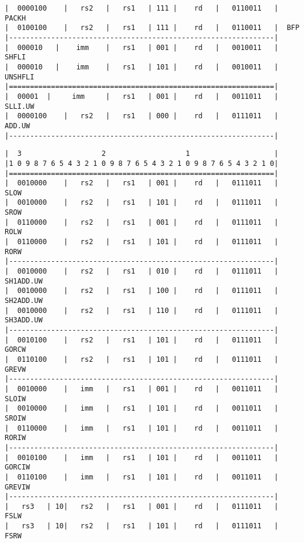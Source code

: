 \begin{minipage}{\linewidth}
\begin{verbatim}
|  0000100    |   rs2   |   rs1   | 111 |    rd   |   0110011   |  PACKH
|  0100100    |   rs2   |   rs1   | 111 |    rd   |   0110011   |  BFP
|---------------------------------------------------------------|
|  000010   |    imm    |   rs1   | 001 |    rd   |   0010011   |  SHFLI
|  000010   |    imm    |   rs1   | 101 |    rd   |   0010011   |  UNSHFLI
|===============================================================|
|  00001  |     imm     |   rs1   | 001 |    rd   |   0011011   |  SLLI.UW
|  0000100    |   rs2   |   rs1   | 000 |    rd   |   0111011   |  ADD.UW
|---------------------------------------------------------------|
\end{verbatim}
\end{minipage}

\begin{minipage}{\linewidth}
\begin{verbatim}
|  3                   2                   1                    |
|1 0 9 8 7 6 5 4 3 2 1 0 9 8 7 6 5 4 3 2 1 0 9 8 7 6 5 4 3 2 1 0|
|===============================================================|
|  0010000    |   rs2   |   rs1   | 001 |    rd   |   0111011   |  SLOW
|  0010000    |   rs2   |   rs1   | 101 |    rd   |   0111011   |  SROW
|  0110000    |   rs2   |   rs1   | 001 |    rd   |   0111011   |  ROLW
|  0110000    |   rs2   |   rs1   | 101 |    rd   |   0111011   |  RORW
|---------------------------------------------------------------|
|  0010000    |   rs2   |   rs1   | 010 |    rd   |   0111011   |  SH1ADD.UW
|  0010000    |   rs2   |   rs1   | 100 |    rd   |   0111011   |  SH2ADD.UW
|  0010000    |   rs2   |   rs1   | 110 |    rd   |   0111011   |  SH3ADD.UW
|---------------------------------------------------------------|
|  0010100    |   rs2   |   rs1   | 101 |    rd   |   0111011   |  GORCW
|  0110100    |   rs2   |   rs1   | 101 |    rd   |   0111011   |  GREVW
|---------------------------------------------------------------|
|  0010000    |   imm   |   rs1   | 001 |    rd   |   0011011   |  SLOIW
|  0010000    |   imm   |   rs1   | 101 |    rd   |   0011011   |  SROIW
|  0110000    |   imm   |   rs1   | 101 |    rd   |   0011011   |  RORIW
|---------------------------------------------------------------|
|  0010100    |   imm   |   rs1   | 101 |    rd   |   0011011   |  GORCIW
|  0110100    |   imm   |   rs1   | 101 |    rd   |   0011011   |  GREVIW
|---------------------------------------------------------------|
|   rs3   | 10|   rs2   |   rs1   | 001 |    rd   |   0111011   |  FSLW
|   rs3   | 10|   rs2   |   rs1   | 101 |    rd   |   0111011   |  FSRW

\end{verbatim}
\end{minipage}
